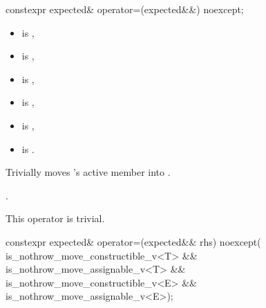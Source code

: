 %
\begin{itemdecl}
constexpr expected& operator=(expected&&) noexcept;
\end{itemdecl}

\begin{itemdescr}
\pnum
\constraints
\begin{itemize}
\item {} is ,
\item {} is ,
\item {} is ,
\item {} is ,
\item {} is ,
\item {} is .
\end{itemize}

\pnum
\effects
Trivially moves 's active member into .

\pnum
\returns
{}.

\pnum
\remarks
This operator is trivial.
\end{itemdescr}

%
\begin{itemdecl}
constexpr expected& operator=(expected&& rhs) noexcept(
    is_nothrow_move_constructible_v<T> && is_nothrow_move_assignable_v<T> &&
    is_nothrow_move_constructible_v<E> && is_nothrow_move_assignable_v<E>);
\end{itemdecl}


